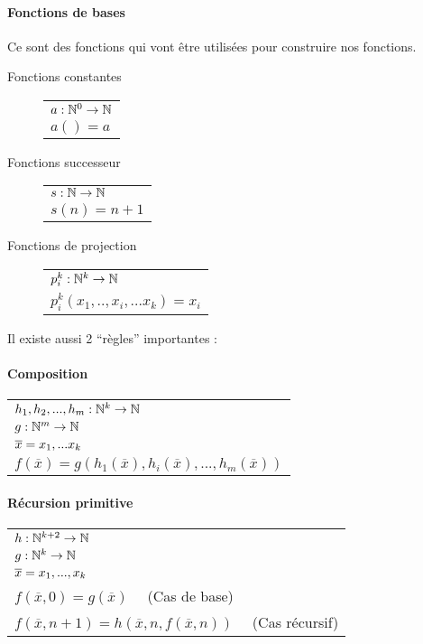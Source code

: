 \paragraph{Fonctions de bases} Ce sont des fonctions qui vont être utilisées
pour construire nos fonctions.

\begin{description}
	\item[Fonctions constantes]
		\begin{tabular}{|l|}
			\hline
			$a: \mathbb{N}^0 \rightarrow \mathbb{N}$\\
			$a() = a$\\
			\hline
		\end{tabular}
	\item[Fonctions successeur]
		\begin{tabular}{|l|}
			\hline
			$s: \mathbb{N} \rightarrow \mathbb{N}$\\
			$s(n) = n + 1$\\
			\hline
		\end{tabular}
	\item[Fonctions de projection]
		\begin{tabular}{|l|}
			\hline
			$p^k_i: \mathbb{N}^k \rightarrow \mathbb{N}$\\
			$p^k_i(x_1,..,x_i,...x_k) = x_i$\\
			\hline
		\end{tabular}
\end{description}

Il existe aussi 2 ``règles'' importantes :
\paragraph{Composition}
\begin{tabular}{|l|}
	\hline
	$h_1, h_2,...,h_m: \mathbb{N}^k \rightarrow \mathbb{N}$\\
	$g: \mathbb{N}^m \rightarrow \mathbb{N}$\\
	$\overline{x} =x_1,...x_k$ \\
	$f(\overline{x}) =
	g(h_1(\overline{x}),h_i(\overline{x}),...,h_m(\overline{x}))$\\
	\hline
\end{tabular}

\paragraph{Récursion primitive}
\begin{tabular}{|l|}
	\hline
	$h: \mathbb{N}^{k+2} \rightarrow \mathbb{N}$\\
	$g: \mathbb{N}^k \rightarrow \mathbb{N}$\\
	$\overline{x} =x_1,...,x_k$ \\
	$f(\overline{x}, 0) = g(\overline{x}) \quad$ (Cas de base)\\
	$f(\overline{x}, n+1) =
	h(\overline{x},n, f(\overline{x}, n))\quad$ (Cas récursif)\\
	\hline
\end{tabular}


